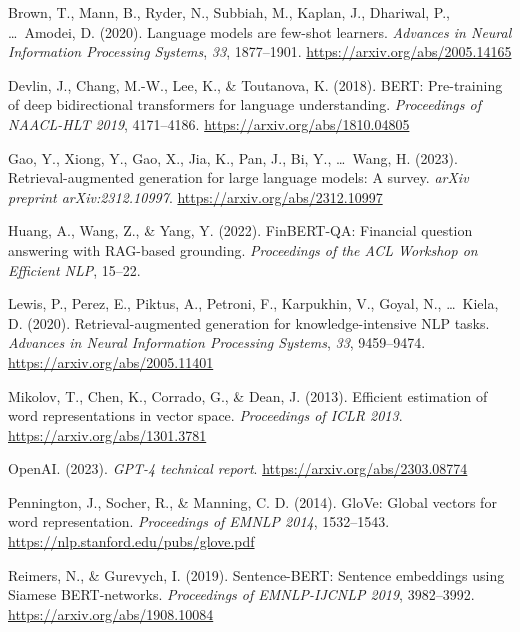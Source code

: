 \documentclass[12pt,a4paper]{article}
\begin{document}
\small
\begin{enumerate}[label={[\arabic*]}, leftmargin=*, itemsep=2pt]

\item Brown, T., Mann, B., Ryder, N., Subbiah, M., Kaplan, J., Dhariwal, P., \ldots\ Amodei, D. (2020). Language models are few-shot learners. \textit{Advances in Neural Information Processing Systems}, \textit{33}, 1877--1901. \url{https://arxiv.org/abs/2005.14165}

\item Devlin, J., Chang, M.-W., Lee, K., \& Toutanova, K. (2018). BERT: Pre-training of deep bidirectional transformers for language understanding. \textit{Proceedings of NAACL-HLT 2019}, 4171--4186. \url{https://arxiv.org/abs/1810.04805}

\item Gao, Y., Xiong, Y., Gao, X., Jia, K., Pan, J., Bi, Y., \ldots\ Wang, H. (2023). Retrieval-augmented generation for large language models: A survey. \textit{arXiv preprint arXiv:2312.10997}. \url{https://arxiv.org/abs/2312.10997}

\item Huang, A., Wang, Z., \& Yang, Y. (2022). FinBERT-QA: Financial question answering with RAG-based grounding. \textit{Proceedings of the ACL Workshop on Efficient NLP}, 15--22.

\item Lewis, P., Perez, E., Piktus, A., Petroni, F., Karpukhin, V., Goyal, N., \ldots\ Kiela, D. (2020). Retrieval-augmented generation for knowledge-intensive NLP tasks. \textit{Advances in Neural Information Processing Systems}, \textit{33}, 9459--9474. \url{https://arxiv.org/abs/2005.11401}

\item Mikolov, T., Chen, K., Corrado, G., \& Dean, J. (2013). Efficient estimation of word representations in vector space. \textit{Proceedings of ICLR 2013}. \url{https://arxiv.org/abs/1301.3781}

\item OpenAI. (2023). \textit{GPT-4 technical report}. \url{https://arxiv.org/abs/2303.08774}

\item Pennington, J., Socher, R., \& Manning, C. D. (2014). GloVe: Global vectors for word representation. \textit{Proceedings of EMNLP 2014}, 1532--1543. \url{https://nlp.stanford.edu/pubs/glove.pdf}

\item Reimers, N., \& Gurevych, I. (2019). Sentence-BERT: Sentence embeddings using Siamese BERT-networks. \textit{Proceedings of EMNLP-IJCNLP 2019}, 3982--3992. \url{https://arxiv.org/abs/1908.10084}


\end{enumerate}
\end{document}
